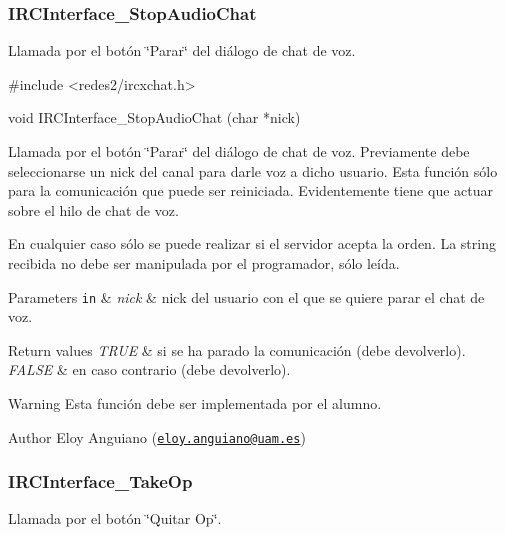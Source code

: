  \hypertarget{IRCInterface_StopAudioChat}{}\subsubsection{I\+R\+C\+Interface\+\_\+\+Stop\+Audio\+Chat}\label{IRCInterface_StopAudioChat}
Llamada por el botón \char`\"{}\+Parar\char`\"{} del diálogo de chat de voz.


\begin{DoxyCode}
\textcolor{preprocessor}{#include <redes2/ircxchat.h>}

\textcolor{keywordtype}{void} IRCInterface\_StopAudioChat (\textcolor{keywordtype}{char} *nick)
\end{DoxyCode}


Llamada por el botón \char`\"{}\+Parar\char`\"{} del diálogo de chat de voz. Previamente debe seleccionarse un nick del canal para darle voz a dicho usuario. Esta función sólo para la comunicación que puede ser reiniciada. Evidentemente tiene que actuar sobre el hilo de chat de voz.

En cualquier caso sólo se puede realizar si el servidor acepta la orden. La string recibida no debe ser manipulada por el programador, sólo leída.


\begin{DoxyParams}[1]{Parameters}
\mbox{\tt in}  & {\em nick} & nick del usuario con el que se quiere parar el chat de voz.\\
\hline
\end{DoxyParams}

\begin{DoxyRetVals}{Return values}
{\em T\+R\+UE} & si se ha parado la comunicación (debe devolverlo). \\
\hline
{\em F\+A\+L\+SE} & en caso contrario (debe devolverlo).\\
\hline
\end{DoxyRetVals}
\begin{DoxyWarning}{Warning}
Esta función debe ser implementada por el alumno.
\end{DoxyWarning}
\begin{DoxyAuthor}{Author}
Eloy Anguiano (\href{mailto:eloy.anguiano@uam.es}{\tt eloy.\+anguiano@uam.\+es})
\end{DoxyAuthor}


 \hypertarget{IRCInterface_TakeOp}{}\subsubsection{I\+R\+C\+Interface\+\_\+\+Take\+Op}\label{IRCInterface_TakeOp}
Llamada por el botón \char`\"{}\+Quitar Op\char`\"{}.


